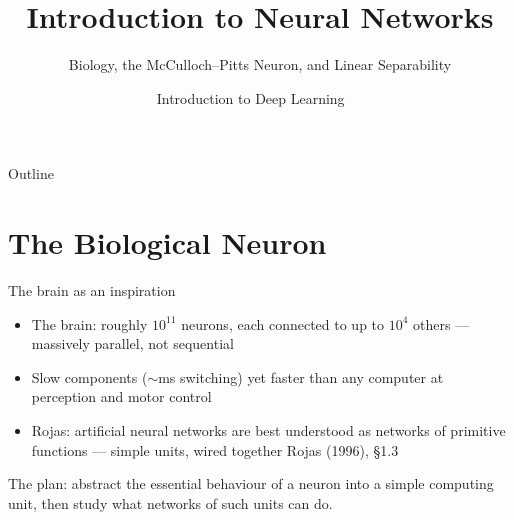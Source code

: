 \documentclass[aspectratio=169, 11pt]{beamer}
\title{Introduction to Neural Networks}
\subtitle{Biology, the McCulloch--Pitts Neuron, and Linear Separability}
\author{Introduction to Deep Learning \ \textperiodcentered\ }
\institute{}
\date{}
\newcommand{\src}[3]{}      %
\newcommand{\nosrc}{}       %
\begin{document}
\maketitle

\begin{frame}{Outline}
  \nosrc
  \tableofcontents
\end{frame}

\section{The Biological Neuron}

\begin{frame}{The brain as an inspiration}
  \src{rojas1996}{section}{1.3.1}
  \src{rojas1996}{section}{1.1.1}
  \begin{itemize}
    \item The brain: roughly $10^{11}$ neurons, each connected
          to up to $10^{4}$ others --- massively
          \alert{parallel}, not sequential
    \item Slow components ($\sim$ms switching) yet faster than
          any computer at perception and motor control
    \item Rojas: artificial neural networks are best understood
          as \alert{networks of primitive functions} ---
          simple units, wired together
          \hfill{\scriptsize Rojas (1996), \S1.3}
  \end{itemize}
  \vspace{0.4em}
  \begin{redhighlight}
    The plan: abstract the essential behaviour of a neuron
    into a simple computing unit, then study what networks of
    such units can do.
  \end{redhighlight}
\end{frame}
\end{document}
